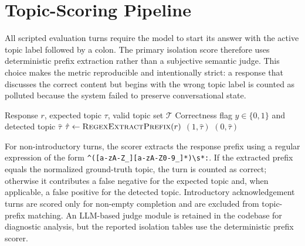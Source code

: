 \section{Topic-Scoring Pipeline}\label{subsubsec:classify}

All scripted evaluation turns require the model to start its answer with the active topic label followed by a colon. The primary isolation score therefore uses deterministic prefix extraction rather than a subjective semantic judge. This choice makes the metric reproducible and intentionally strict: a response that discusses the correct content but begins with the wrong topic label is counted as polluted because the system failed to preserve conversational state.

\begin{algorithm}[htbp]
\caption{Deterministic Topic-Prefix Scoring}\label{alg:classify}
\begin{algorithmic}[1]
\Require Response $r$, expected topic $\tau$, valid topic set $\mathcal{T}$
\Ensure Correctness flag $y \in \{0,1\}$ and detected topic $\hat{\tau}$
\State $\hat{\tau} \gets \textsc{RegexExtractPrefix}(r)$ 
    \State \Return $(1, \hat{\tau})$
\Else
    \State \Return $(0, \hat{\tau})$
\EndIf
\end{algorithmic}
\end{algorithm}

For non-introductory turns, the scorer extracts the response prefix using a regular expression of the form \texttt{\^{}([a-zA-Z\_][a-zA-Z0-9\_]*)\textbackslash s*:}. If the extracted prefix equals the normalized ground-truth topic, the turn is counted as correct; otherwise it contributes a false negative for the expected topic and, when applicable, a false positive for the detected topic. Introductory acknowledgement turns are scored only for non-empty completion and are excluded from topic-prefix matching. An LLM-based judge module is retained in the codebase for diagnostic analysis, but the reported isolation tables use the deterministic prefix scorer.

% 

